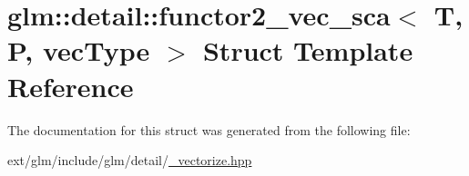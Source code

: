 \hypertarget{structglm_1_1detail_1_1functor2__vec__sca}{\section{glm\-:\-:detail\-:\-:functor2\-\_\-vec\-\_\-sca$<$ T, P, vec\-Type $>$ Struct Template Reference}
\label{structglm_1_1detail_1_1functor2__vec__sca}
}


The documentation for this struct was generated from the following file\-:\begin{DoxyCompactItemize}
\item 
ext/glm/include/glm/detail/\hyperlink{__vectorize_8hpp}{\-\_\-vectorize.\-hpp}\end{DoxyCompactItemize}
